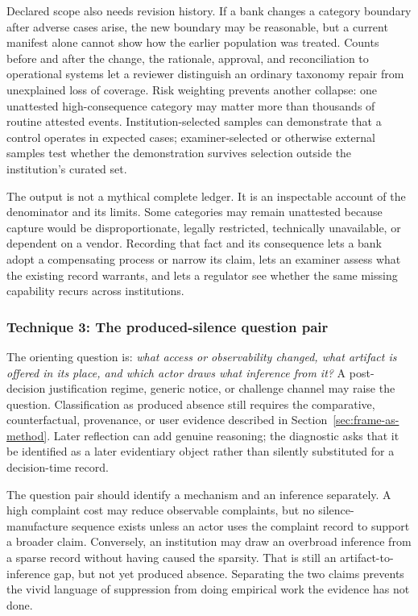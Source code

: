 Declared scope also needs revision history. If a bank changes a category
boundary after adverse cases arise, the new boundary may be reasonable, but a
current manifest alone cannot show how the earlier population was treated.
Counts before and after the change, the rationale, approval, and reconciliation
to operational systems let a reviewer distinguish an ordinary taxonomy repair
from unexplained loss of coverage. Risk weighting prevents another collapse:
one unattested high-consequence category may matter more than thousands of
routine attested events. Institution-selected samples can demonstrate that a
control operates in expected cases; examiner-selected or otherwise external
samples test whether the demonstration survives selection outside the
institution's curated set.

The output is not a mythical complete ledger. It is an inspectable account of
the denominator and its limits. Some categories may remain unattested because
capture would be disproportionate, legally restricted, technically unavailable,
or dependent on a vendor. Recording that fact and its consequence lets a bank
adopt a compensating process or narrow its claim, lets an examiner assess what
the existing record warrants, and lets a regulator see whether the same missing
capability recurs across institutions.

\subsubsection{Technique 3: The produced-silence question pair}
\label{sec:diagnostics:question-pair}

The orienting question is: \emph{what access or observability changed, what
artifact is offered in its place, and which actor draws what inference from
it?} A post-decision justification regime, generic notice, or challenge channel
may raise the question. Classification as produced absence still requires the
comparative, counterfactual, provenance, or user evidence described in
Section~\ref{sec:frame-as-method}. Later reflection can add genuine reasoning;
the diagnostic asks that it be identified as a later evidentiary object rather
than silently substituted for a decision-time record.

The question pair should identify a mechanism and an inference separately. A
high complaint cost may reduce observable complaints, but no silence-manufacture
sequence exists unless an actor uses the complaint record to support a broader
claim. Conversely, an institution may draw an overbroad inference from a sparse
record without having caused the sparsity. That is still an artifact-to-inference
gap, but not yet produced absence. Separating the two claims prevents the vivid
language of suppression from doing empirical work the evidence has not done.

